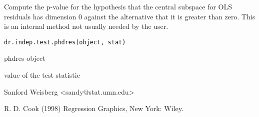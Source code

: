 \begin{Description}\relax
Compute the p-value for the hypothesis that the central
subspace for OLS residuals has dimension 0 against the alternative that it
is greater than zero.  This is an
internal method not usually needed by the user.
\end{Description}
\begin{Usage}
\begin{verbatim}
dr.indep.test.phdres(object, stat)
\end{verbatim}
\end{Usage}
\begin{Arguments}
\begin{ldescription}
\item[\code{object}] phdres object 
\item[\code{stat}] value of the test statistic 
\end{ldescription}
\end{Arguments}
\begin{Author}\relax
Sanford Weisberg <sandy@stat.umn.edu>
\end{Author}
\begin{References}\relax
R. D. Cook (1998) Regression Graphics, New York:  Wiley.
\end{References}
\begin{SeeAlso}\relax
{}
\end{SeeAlso}

